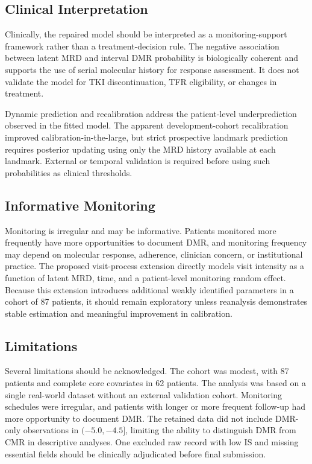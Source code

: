 \documentclass[11pt]{article}
\begin{document}
\subsection{Clinical Interpretation}

Clinically, the repaired model should be interpreted as a monitoring-support framework rather than a treatment-decision rule. The negative association between latent MRD and interval DMR probability is biologically coherent and supports the use of serial molecular history for response assessment. It does not validate the model for TKI discontinuation, TFR eligibility, or changes in treatment.

Dynamic prediction and recalibration address the patient-level underprediction observed in the fitted model. The apparent development-cohort recalibration improved calibration-in-the-large, but strict prospective landmark prediction requires posterior updating using only the MRD history available at each landmark. External or temporal validation is required before using such probabilities as clinical thresholds.

\subsection{Informative Monitoring}

Monitoring is irregular and may be informative. Patients monitored more frequently have more opportunities to document DMR, and monitoring frequency may depend on molecular response, adherence, clinician concern, or institutional practice. The proposed visit-process extension directly models visit intensity as a function of latent MRD, time, and a patient-level monitoring random effect. Because this extension introduces additional weakly identified parameters in a cohort of 87 patients, it should remain exploratory unless reanalysis demonstrates stable estimation and meaningful improvement in calibration.

\subsection{Limitations}

Several limitations should be acknowledged. The cohort was modest, with 87 patients and complete core covariates in 62 patients. The analysis was based on a single real-world dataset without an external validation cohort. Monitoring schedules were irregular, and patients with longer or more frequent follow-up had more opportunity to document DMR. The retained data did not include DMR-only observations in \((-5.0,-4.5]\), limiting the ability to distinguish DMR from CMR in descriptive analyses. One excluded raw record with low IS and missing essential fields should be clinically adjudicated before final submission.
\end{document}
